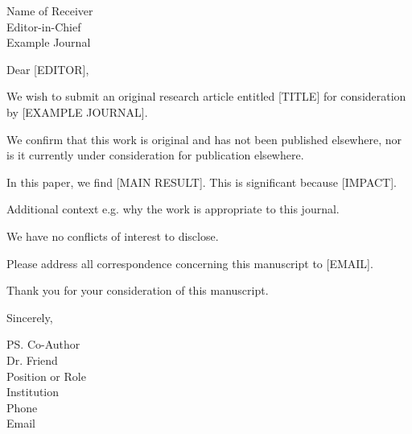 \documentclass[12pt]{letter}
\begin{document}
\begin{letter}{%
	Name of Receiver \\
	Editor-in-Chief \\
	Example Journal
}

\opening{Dear [EDITOR],} %

We wish to submit an original research article entitled [TITLE]
for consideration by [EXAMPLE JOURNAL].

We confirm that this work is original and has not been published elsewhere, nor
is it currently under consideration for publication elsewhere.

In this paper, we find [MAIN RESULT]. This is significant because [IMPACT].

Additional context e.g. why the work is appropriate to this journal.

We have no conflicts of interest to disclose.

Please address all correspondence concerning this manuscript to [EMAIL].

Thank you for your consideration of this manuscript.

\closing{Sincerely,}

\ps{%
	Co-Author \\
	Dr. Friend \\
	Position or Role \\
	Institution \\
	Phone \\
	Email
}

\end{letter}
\end{document}
